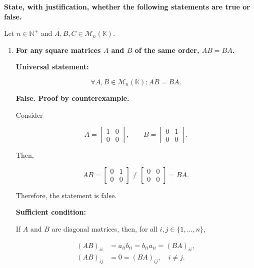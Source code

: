 
\item {\bfseries\boldmath
    State, with justification, whether the following
    statements are true or false.
}

Let $n\in\mathbb{N}^+$ and
$A,B,C\in\mathcal{M}_n(\mathbb{K})$.

\begin{enumerate}[label=\alph*)]

\item {\bfseries\boldmath
    For any square matrices $A$ and $B$
    of the same order, $AB=BA$.
}

\begin{answer}
    \textbf{Universal statement:}

    $$
    \forall A,B\in\mathcal{M}_n(\mathbb{K}):
    AB=BA.
    $$

    \textbf{False. Proof by counterexample.}

    Consider

    $$
    A=\begin{bmatrix}
        1 & 0 \\
        0 & 0
    \end{bmatrix},
    \qquad
    B=\begin{bmatrix}
        0 & 1 \\
        0 & 0
    \end{bmatrix}.
    $$

    Then,

    $$
    AB=\begin{bmatrix}
        0 & 1 \\
        0 & 0
    \end{bmatrix}
    \neq
    \begin{bmatrix}
        0 & 0 \\
        0 & 0
    \end{bmatrix}=BA.
    $$

    Therefore, the statement is false.

    \par\bigskip
    \noindent\textbf{Sufficient condition:}

    If $A$ and $B$ are diagonal matrices,
    then, for all $i,j\in\{1,\ldots,n\}$,

    $$
    \begin{aligned}
        (AB)_{ii}
            &=a_{ii}b_{ii}
            =b_{ii}a_{ii}
            =(BA)_{ii},\\[0.5em]
        (AB)_{ij}
            &=0=(BA)_{ij},
            \quad i\neq j.
    \end{aligned}
    $$


\end{answer}
\end{enumerate}
